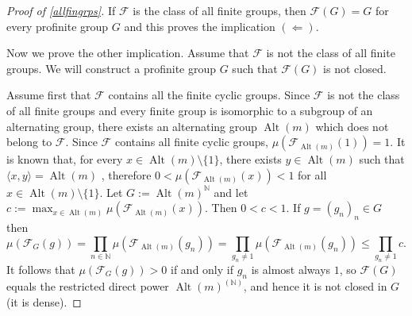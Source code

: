 \documentclass{amsart}
\DeclareMathOperator{\alt}{Alt}
\numberwithin{equation}{section}
\begin{document}
\begin{proof}[Proof of \cref{allfingrps}]

If $\mathcal F$ is the class of all finite groups, then $\mathcal{F}(G)=G$ for every profinite group $G$ and this proves the implication $(\Leftarrow)$.

Now we prove the other implication. Assume that $\mathcal F$ is not the class of all finite groups. We will construct a profinite group $G$ such that $\mathcal{F}(G)$ is not closed.

Assume first that $\mathcal F$ contains all the finite cyclic groups. Since $\mathcal F$ is not the class of all finite groups and every finite group is isomorphic to a subgroup of an alternating group, there exists an alternating group $\alt(m)$ which does not belong to $\mathcal F$. Since $\mathcal{F}$ contains all finite cyclic groups, $\mu(\mathcal{F}_{\alt(m)}(1))=1$. It is known that, for every $x \in \alt(m) \setminus \{1\}$, there exists $y \in \alt(m)$ such that $\langle x,y \rangle = \alt(m)$ \cite{gk}, therefore $0< \mu(\mathcal{F}_{\alt(m)}(x)) < 1$ for all $x \in \alt(m) \setminus \{1\}$. Let $G := \alt(m)^{\mathbb{N}}$ and let $c := \max_{x \in \alt(m)} \mu(\mathcal{F}_{\alt(m)}(x))$. Then $0 < c < 1$. If $g = (g_n)_n \in G$ then
$$\mu(\mathcal{F}_G(g)) = \prod_{n \in \mathbb{N}} \mu(\mathcal{F}_{\alt(m)}(g_n)) = \prod_{g_n \neq 1} \mu(\mathcal{F}_{\alt(m)}(g_n)) \leq \prod_{g_n \neq 1} c.$$
It follows that $\mu(\mathcal{F}_G(g)) > 0$ if and only if $g_n$ is almost always $1$, so $\mathcal{F}(G)$ equals the restricted direct power $\alt(m)^{(\mathbb{N})}$, and hence it is not closed in $G$ (it is dense).


\end{proof}
\end{document}
